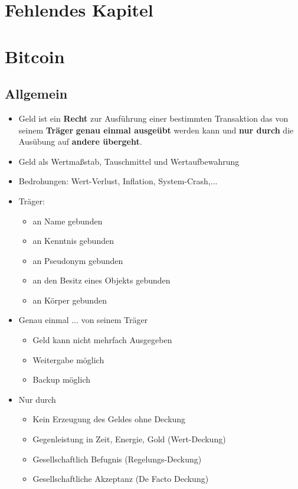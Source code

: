 \documentclass{article} %
\begin{document}
	
	\section{Fehlendes Kapitel}	
	
		
	\section{Bitcoin}
	\subsection{Allgemein}
	\begin{itemize}
		\item \glqq Geld ist ein \textbf{Recht} zur Ausführung einer bestimmten Transaktion das von seinem \textbf{Träger} \textbf{genau einmal ausgeübt} werden kann und \textbf{nur durch} die Ausübung auf \textbf{andere übergeht}.\grqq
		\item Geld als Wertmaßstab, Tauschmittel und Wertaufbewahrung
		\item Bedrohungen: Wert-Verlust, Inflation, System-Crash,...
		\item \glqq Träger:\grqq
		\begin{itemize}
			\item an Name gebunden
			\item an Kenntnis gebunden
			\item an Pseudonym gebunden
			\item an den Besitz eines Objekts gebunden
			\item an Körper gebunden
		\end{itemize}
		\item \glqq Genau einmal ... von seinem Träger \grqq
		\begin{itemize}
			\item Geld kann nicht mehrfach Ausgegeben
			\item Weitergabe möglich
			\item Backup möglich
		\end{itemize}
		\item \glqq Nur durch\grqq
		\begin{itemize}
			\item Kein Erzeugung des Geldes ohne Deckung
			\item Gegenleistung in Zeit, Energie, Gold (Wert-Deckung)
			\item Gesellschaftlich Befugnis (Regelungs-Deckung)
			\item Gesellschaftliche Akzeptanz (De Facto Deckung)

\end{itemize}
\end{itemize}
\end{document}
